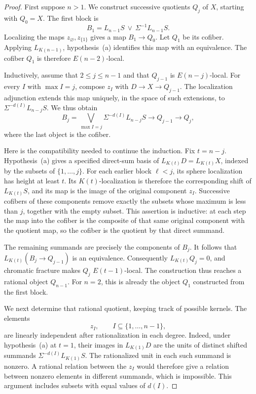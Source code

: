 \begin{proof}
First suppose \(n>1\). We construct successive quotients \(Q_j\) of
\(X\), starting with \(Q_0=X\). The first block is
\[
B_1=L_{n-1}S\ \vee\ \Sigma^{-1}L_{n-1}S.
\]
Localizing the maps \(z_\varnothing,z_{\{1\}}\) gives a map
\(B_1\to Q_0\). Let \(Q_1\) be its cofiber. Applying
\(L_{K(n-1)}\), hypothesis~(a) identifies this map with an
equivalence. The cofiber \(Q_1\) is therefore \(E(n-2)\)-local.

Inductively, assume that \(2\leq j\leq n-1\) and that \(Q_{j-1}\)
is \(E(n-j)\)-local. For every \(I\) with \(\max I=j\), compose
\(z_I\) with \(D\to X\to Q_{j-1}\). The localization adjunction
extends this map uniquely, in the space of such extensions, to
\(\Sigma^{-d(I)}L_{n-j}S\). We thus obtain
\begin{equation}
B_j=\bigvee_{\max I=j}\Sigma^{-d(I)}L_{n-j}S
 \longrightarrow Q_{j-1}\longrightarrow Q_j,
\label{eq:block-quotient}
\end{equation}
where the last object is the cofiber.

Here is the compatibility needed to continue the induction. Fix
\(t=n-j\). Hypothesis~(a) gives a specified direct-sum basis of
\(L_{K(t)}D=L_{K(t)}X\), indexed by the subsets of
\(\{1,\ldots,j\}\). For each earlier block \(\ell<j\), its sphere
localization has height at least \(t\). Its \(K(t)\)-localization is
therefore the corresponding shift of \(L_{K(t)}S\), and its map is
the image of the original component \(z_I\). Successive cofibers
of these components remove exactly the subsets whose maximum is
less than \(j\), together with the empty subset. This assertion is
inductive: at each step the map into the cofiber is the composite
of that same original component with the quotient map, so the
cofiber is the quotient by that direct summand.

The remaining summands are precisely the components of \(B_j\).
It follows that \(L_{K(t)}(B_j\to Q_{j-1})\) is an equivalence.
Consequently \(L_{K(t)}Q_j=0\), and chromatic fracture makes
\(Q_j\) \(E(t-1)\)-local. The construction thus reaches a rational
object \(Q_{n-1}\). For \(n=2\), this is already the object \(Q_1\)
constructed from the first block.

We next determine that rational quotient, keeping track of possible
kernels. The elements
\[
z_I,\qquad I\subseteq\{1,\ldots,n-1\},
\]
are linearly independent after rationalization in each degree.
Indeed, under hypothesis~(a) at \(t=1\), their images in
\(L_{K(1)}D\) are the units of distinct shifted summands
\(\Sigma^{-d(I)}L_{K(1)}S\). The rationalized unit in each such
summand is nonzero. A rational relation between the \(z_I\) would
therefore give a relation between nonzero elements in different
summands, which is impossible. This argument includes subsets
with equal values of \(d(I)\).


\end{proof}
